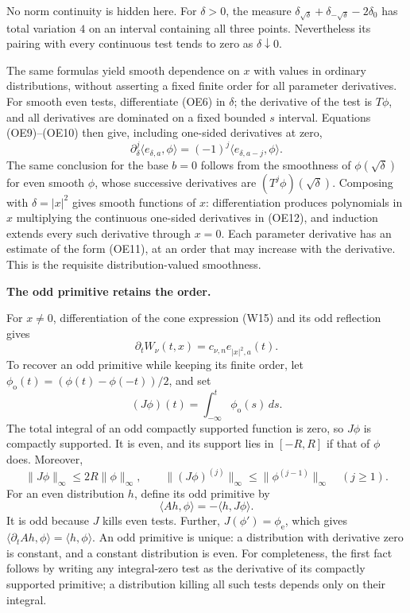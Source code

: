 \documentclass[
  11pt,
]{article}
\begin{document}
No norm continuity is hidden here. For \(\delta>0\), the measure
\(\delta_{\sqrt\delta}+\delta_{-\sqrt\delta}-2\delta_0\) has total
variation \(4\) on an interval containing all three points. Nevertheless
its pairing with every continuous test tends to zero as
\(\delta\downarrow0\).

The same formulas yield smooth dependence on \(x\) with values in
ordinary distributions, without asserting a fixed finite order for all
parameter derivatives. For smooth even tests, differentiate (OE6) in
\(\delta\); the derivative of the test is \(T\phi\), and all derivatives
are dominated on a fixed bounded \(s\) interval. Equations (OE9)--(OE10)
then give, including one-sided derivatives at zero, \[
 \partial_\delta^j\langle e_{\delta,a},\phi\rangle
       =(-1)^j\langle e_{\delta,a-j},\phi\rangle.
 \tag{OE12}
\] The same conclusion for the base \(b=0\) follows from the smoothness
of \(\phi(\sqrt\delta)\) for even smooth \(\phi\), whose successive
derivatives are \((T^j\phi)(\sqrt\delta)\). Composing with
\(\delta=|x|^2\) gives smooth functions of \(x\): differentiation
produces polynomials in \(x\) multiplying the continuous one-sided
derivatives in (OE12), and induction extends every such derivative
through \(x=0\). Each parameter derivative has an estimate of the form
(OE11), at an order that may increase with the derivative. This is the
requisite distribution-valued smoothness.

\textbf{The odd primitive retains the order.}

For \(x\ne0\), differentiation of the cone expression (W15) and its odd
reflection gives \[
 \partial_tW_\nu(t,x)=c_{\nu,n}e_{|x|^2,a}(t).
 \tag{OE13}
\] To recover an odd primitive while keeping its finite order, let
\(\phi_{\mathrm o}(t)=(\phi(t)-\phi(-t))/2\), and set \[
 (J\phi)(t)=\int_{-\infty}^t\phi_{\mathrm o}(s)\,ds.
 \tag{OE14}
\] The total integral of an odd compactly supported function is zero, so
\(J\phi\) is compactly supported. It is even, and its support lies in
\([-R,R]\) if that of \(\phi\) does. Moreover, \[
 \|J\phi\|_\infty\leq2R\|\phi\|_\infty,
 \qquad
 \|(J\phi)^{(j)}\|_\infty\leq
              \|\phi^{(j-1)}\|_\infty\quad(j\geq1).
 \tag{OE15}
\] For an even distribution \(h\), define its odd primitive by \[
 \langle Ah,\phi\rangle=-\langle h,J\phi\rangle.
 \tag{OE16}
\] It is odd because \(J\) kills even tests. Further,
\(J(\phi')=\phi_{\mathrm e}\), which gives
\(\langle\partial_tAh,\phi\rangle=\langle h,\phi\rangle\). An odd
primitive is unique: a distribution with derivative zero is constant,
and a constant distribution is even. For completeness, the first fact
follows by writing any integral-zero test as the derivative of its
compactly supported primitive; a distribution killing all such tests
depends only on their integral.
\end{document}
